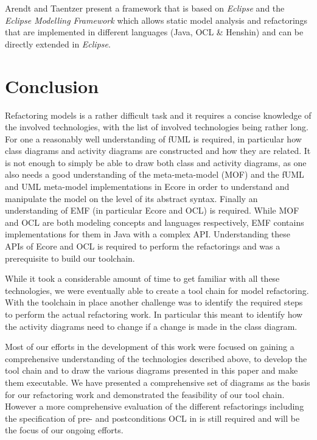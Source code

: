 \documentclass{llncs}
\begin{document}
Arendt and Taentzer \cite{DBLP:journals/ase/ArendtT13} present a framework that is based on \textit{Eclipse} and the
\textit{Eclipse Modelling Framework} which allows static model analysis and refactorings that are implemented in
different languages (Java, OCL \& Henshin) and can be directly extended in \textit{Eclipse}.


\section{Conclusion}
\label{sec:conclusion}
Refactoring models is a rather difficult task and it requires a concise knowledge of the involved technologies, with
the list of involved technologies being rather long. For one a reasonably well understanding of fUML is required, in
particular how class diagrams and activity diagrams are constructed and how they are related. It is not enough to simply
be able to draw both class and activity diagrams, as one also needs a good understanding of the meta-meta-model (MOF) and
the fUML and UML meta-model implementations in Ecore in order to understand and manipulate the model on the level of its 
abstract syntax. Finally an understanding of EMF (in particular Ecore and OCL) is required. While MOF and OCL are both 
modeling concepts and languages respectively, EMF contains implementations for them in Java with a complex API. 
Understanding these APIs of Ecore and OCL is required to perform the refactorings and was a prerequisite to build
our toolchain.

While it took a considerable amount of time to get familiar with all these technologies, we were eventually able to
create a tool chain for model refactoring. With the toolchain in place another challenge was to identify the required 
steps to perform the actual refactoring work. In particular this meant to identify how the activity diagrams need to 
change if a change is made in the class diagram.

Most of our efforts in the development of this work were focused on gaining a comprehensive understanding of the
technologies described above, to develop the tool chain and to draw the various diagrams presented in this paper and make 
them executable. We have presented a comprehensive set of diagrams as the basis for our refactoring work and demonstrated 
the feasibility of our tool chain. However a more comprehensive evaluation of the different refactorings including the 
specification of pre- and postconditions OCL in is still required and will be the focus of our ongoing efforts.

\newpage


\end{document}
